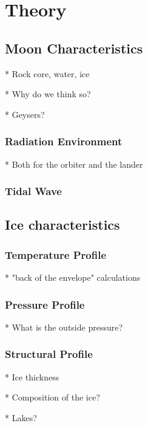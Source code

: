 \section{\textbf{Theory}}


\subsection{Moon Characteristics} %

* Rock core, water, ice

    * Why do we think so?
    
    * Geysers?
    
\subsubsection{Radiation Environment} %

* Both for the orbiter and the lander

\subsubsection{Tidal Wave} %

\subsection{Ice characteristics} %

\subsubsection{Temperature Profile}

* "back of the envelope" calculations

\subsubsection{Pressure Profile}

* What is the outside pressure?

\subsubsection{Structural Profile}

* Ice thickness

* Composition of the ice? %

* Lakes?

